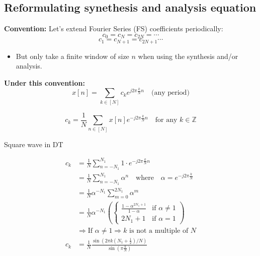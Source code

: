 \subsection{Reformulating synethesis and analysis equation}
\begin{warning}
    \textbf{Convention:} Let's extend Fourier Series (FS) coefficients periodically:
    \[
    c_0 = c_N = c_{2N} = \cdots 
    \]
    \[
    c_1 = c_{N+1} = c_{2N+1} \cdots
    \]
    \begin{itemize}
        \item But only take a finite window of size \( n \) when using the synthesis and/or analysis. 
    \end{itemize}

    \textbf{Under this convention:}
    \[
    x[n] = \sum_{k \in [N]} c_k e^{j2\pi \frac{k}{N} n} \quad \text{(any period)}
    \]

    \[
    c_k = \frac{1}{N} \sum_{n \in [N]} x[n] e^{-j 2\pi \frac{k}{N} n} \quad \text{for any } k \in \mathbb{Z}
    \]
\end{warning}

\begin{example}
    Square wave in DT
    \vspace{1em}

    \begin{align*}
        c_k &= \frac{1}{N} \sum_{n=-N_1}^{N_1} 1 \cdot e^{-j 2\pi \frac{k}{N} n} \\
        &= \frac{1}{N} \sum_{n=-N_1}^{N_1} \alpha^n \quad \text{where} \quad \alpha = e^{-j 2\pi \frac{k}{N}} \\
        &= \frac{1}{N} \alpha^{-N_1} \sum_{m=0}^{2N_1} \alpha^m \\
        &= \frac{1}{N} \alpha^{-N_1} \left( 
        \begin{cases} 
            \frac{1 - \alpha^{2N_1+1}}{1 - \alpha} & \text{if } \alpha \neq 1 \\
            2N_1 + 1 & \text{if } \alpha = 1
        \end{cases}
        \right) \\
        &\Rightarrow \text{If } \alpha \neq 1 \Rightarrow k \text{ is not a multiple of } N \\
        c_k &= \frac{1}{N} \frac{\sin\left( 2\pi k \left( N_1 + \frac{1}{2} \right) / N \right)}{\sin\left( \pi \frac{k}{N} \right)}
    \end{align*}

\end{example}

